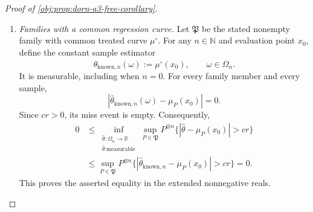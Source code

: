 \begin{proof}[Proof of \cref{obj:prop:dorn-a3-free-corollary}]
\begin{enumerate}
For every transported sample \(\omega\) and every source-cube point \(z\),
\[
\left|
\widehat\mu_n(\omega,T^{-1}z)-\mu_P(z)
\right|
=
\left|
\widehat\mu_n(\omega,T^{-1}z)
-\mu_P(T(T^{-1}z))
\right|
\le Z_{n,P}(\omega).
\]
The source covariate law is supported on that cube, so
\[
\|\widehat\mu_n(\omega,\cdot)\circ T^{-1}-\mu_P\|_{L^\infty(P)}
\le Z_{n,P}(\omega).
\]
Markov's inequality and the common expectation bound now give
\[
\begin{aligned}
&Q_P^{\otimes n}\!\left\{
\|\widehat\mu_n\circ T^{-1}-\mu_P\|_{L^\infty(P)}
>c(\varepsilon)r_{\gamma,n}
\right\}
\\
&\qquad\le
Q_P^{\otimes n}\{Z_{n,P}>c(\varepsilon)r_{\gamma,n}\}
\le
\frac{\mathbb E_{Q_P^{\otimes n}}Z_{n,P}}
{(K/\varepsilon)r_{\gamma,n}}
\le\varepsilon.
\end{aligned}
\]
The sampling identity for \(\mathcal T_n\) expresses the same probability under \(P^{\otimes n}\) when the estimator is computed from the transported sample. Every bound is simultaneous over \(\gamma\in\Gamma\) and source tuples in \(\mathcal D_\gamma\).

\item \emph{Families with a common regression curve.}
Let \(\mathfrak P\) be the stated nonempty family with common treated curve \(\mu^\circ\). For any \(n\in\mathbb N\) and evaluation point \(x_0\), define the constant sample estimator
\[
\widehat\theta_{\mathrm{known},n}(\omega):=\mu^\circ(x_0),
\qquad \omega\in\Omega_n.
\]
It is measurable, including when \(n=0\). For every family member and every sample,
\[
|\widehat\theta_{\mathrm{known},n}(\omega)-\mu_P(x_0)|=0.
\]
Since \(cr>0\), its miss event is empty. Consequently,
\[
\begin{aligned}
0
&\le
\inf_{\substack{\widehat\theta:\Omega_n\to\mathbb R\\
\widehat\theta\ \mathrm{measurable}}}
\sup_{P\in\mathfrak P}
P^{\otimes n}\{|\widehat\theta-\mu_P(x_0)|>cr\}
\\
&\le
\sup_{P\in\mathfrak P}
P^{\otimes n}
\{|\widehat\theta_{\mathrm{known},n}-\mu_P(x_0)|>cr\}
=0.
\end{aligned}
\]
This proves the asserted equality in the extended nonnegative reals.


\end{enumerate}
\end{proof}
